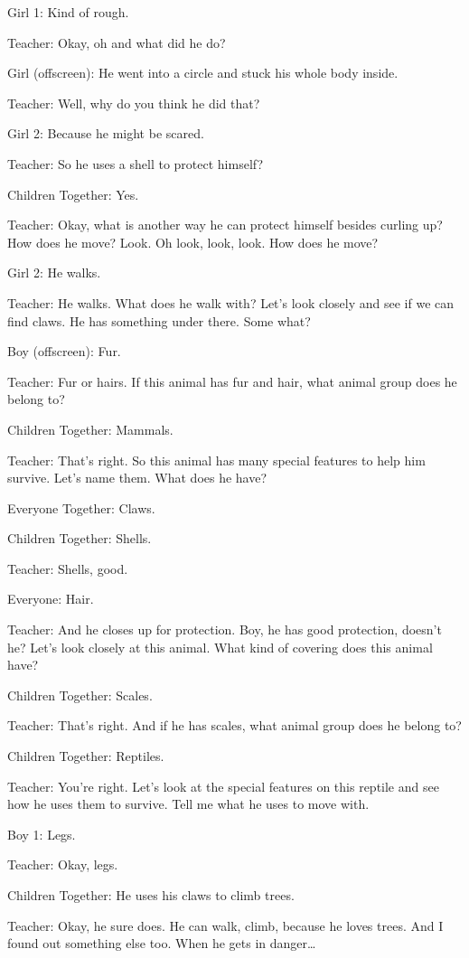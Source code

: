 Girl 1: Kind of rough.

Teacher: Okay, oh and what did he do?

Girl (offscreen): He went into a circle and stuck his whole body inside.

Teacher: Well, why do you think he did that?

Girl 2: Because he might be scared.

Teacher: So he uses a shell to protect himself?

Children Together: Yes.

Teacher: Okay, what is another way he can protect himself besides curling up? How does he move? Look. Oh look, look, look. How does he move?

Girl 2: He walks.

Teacher: He walks. What does he walk with? Let's look closely and see if we can find claws. He has something under there. Some what?

Boy (offscreen): Fur.

Teacher: Fur or hairs. If this animal has fur and hair, what animal group does he belong to?

Children Together: Mammals.

Teacher: That's right. So this animal has many special features to help him survive. Let's name them. What does he have?

Everyone Together: Claws.

Children Together: Shells.

Teacher: Shells, good.

Everyone: Hair.

Teacher: And he closes up for protection. Boy, he has good protection, doesn't he? Let's look closely at this animal. What kind of covering does this animal have?

Children Together: Scales.

Teacher: That's right. And if he has scales, what animal group does he belong to?

Children Together: Reptiles.

Teacher: You're right. Let's look at the special features on this reptile and see how he uses them to survive. Tell me what he uses to move with.

Boy 1: Legs.

Teacher: Okay, legs.

Children Together: He uses his claws to climb trees.

Teacher: Okay, he sure does. He can walk, climb, because he loves trees. And I found out something else too. When he gets in danger\dots

